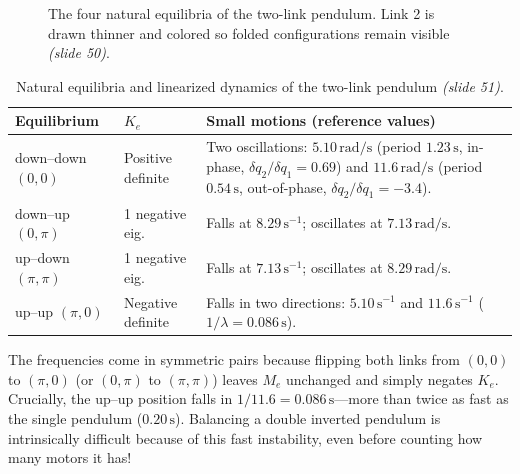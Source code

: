 \documentclass[11pt, a4paper]{article}
\theoremstyle{definition}
\theoremstyle{plain}
\begin{document}
\begin{figure}[ht]
\caption{The four natural equilibria of the two-link pendulum. Link 2 is drawn thinner and colored so folded configurations remain visible \emph{(slide 50)}.}
\label{fig:four_eq}
\end{figure}

\begin{table}[ht]
\centering
\caption{Natural equilibria and linearized dynamics of the two-link pendulum \emph{(slide 51)}.}
\label{tab:twolink_eq}
\renewcommand{\arraystretch}{1.2}
\begin{tabular}{@{}l l p{8.4cm}@{}}
\toprule
\textbf{Equilibrium} & \textbf{$K_e$} & \textbf{Small motions (reference values)} \\
\midrule
down--down $(0,0)$ & Positive definite & Two oscillations: $5.10\,\mathrm{rad/s}$ (period $1.23\,\mathrm{s}$, in-phase, $\delta q_2/\delta q_1 = 0.69$) and $11.6\,\mathrm{rad/s}$ (period $0.54\,\mathrm{s}$, out-of-phase, $\delta q_2/\delta q_1 = -3.4$). \\
down--up $(0,\pi)$ & 1 negative eig. & Falls at $8.29\,\mathrm{s}^{-1}$; oscillates at $7.13\,\mathrm{rad/s}$. \\
up--down $(\pi,\pi)$ & 1 negative eig. & Falls at $7.13\,\mathrm{s}^{-1}$; oscillates at $8.29\,\mathrm{rad/s}$. \\
up--up $(\pi,0)$ & Negative definite & Falls in two directions: $5.10\,\mathrm{s}^{-1}$ and $11.6\,\mathrm{s}^{-1}$ ($1/\lambda = 0.086\,\mathrm{s}$). \\
\bottomrule
\end{tabular}
\end{table}

\begin{intuition}
The frequencies come in symmetric pairs because flipping both links from $(0,0)$ to $(\pi,0)$ (or $(0,\pi)$ to $(\pi,\pi)$) leaves $M_e$ unchanged and simply negates $K_e$. Crucially, the up--up position falls in $1/11.6 = 0.086\,\mathrm{s}$---more than twice as fast as the single pendulum ($0.20\,\mathrm{s}$). Balancing a double inverted pendulum is intrinsically difficult because of this fast instability, even before counting how many motors it has!
\end{intuition}
\end{document}
